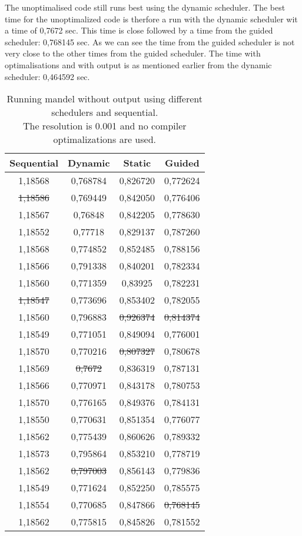 \documentclass[a4paper]{article}
\begin{document}
	\noindent The unoptimalised code still runs best using the dynamic scheduler. 
	The best time for the unoptimalized code is therfore a run with the dynamic scheduler wit a time of 0,7672 sec.
	This time is close followed by a time from the guided scheduler: 0,768145 sec.
	As we can see the time from the guided scheduler is not very close to the other times from the guided scheduler.
	The time with optimalisations and with output is as mentioned earlier from the dynamic scheduler: 0,464592 sec.

	\begin{table}
		\caption{Running mandel without output using different schedulers and sequential.\\The resolution is 0.001 and no compiler optimalizations are used.}
		\label{table:mandel_nout_schedulers}
		\begin{center}
			\begin{tabular}{| c | c | c | c |}
				\hline
				Sequential & Dynamic & Static & Guided\\ 
				\hline
				1,18568 & 0,768784 & 0,826720 & 0,772624\\ 
				\st{1,18586} & 0,769449 & 0,842050 & 0,776406\\ 
				1,18567 & 0,76848 & 0,842205 & 0,778630\\ 
				1,18552 & 0,77718 & 0,829137 & 0,787260\\ 
				1,18568 & 0,774852 & 0,852485 & 0,788156\\ 
				1,18566 & 0,791338 & 0,840201 & 0,782334\\ 
				1,18560 & 0,771359 & 0,83925 & 0,782231\\ 
				\st{1,18547} & 0,773696 & 0,853402 & 0,782055\\ 
				1,18560 & 0,796883 & \st{0,926374} & \st{0,814374}\\ 
				1,18549 & 0,771051 & 0,849094 & 0,776001\\ 
				1,18570 & 0,770216 & \st{0,807327} & 0,780678\\ 
				1,18569 & \st{0,7672} & 0,836319 & 0,787131\\ 
				1,18566 & 0,770971 & 0,843178 & 0,780753\\ 
				1,18570 & 0,776165 & 0,849376 & 0,784131\\ 
				1,18550 & 0,770631 & 0,851354 & 0,776077\\ 
				1,18562 & 0,775439 & 0,860626 & 0,789332\\ 
				1,18573 & 0,795864 & 0,853210 & 0,778719\\ 
				1,18562 & \st{0,797003} & 0,856143 & 0,779836\\ 
				1,18549 & 0,771624 & 0,852250 & 0,785575\\ 
				1,18554 & 0,770685 & 0,847866 & \st{0,768145}\\ 
				\hline
				1,18562 & 0,775815 & 0,845826 & 0,781552\\ 
				\hline
			\end{tabular}
		\end{center}
	\end{table}
\end{document}
